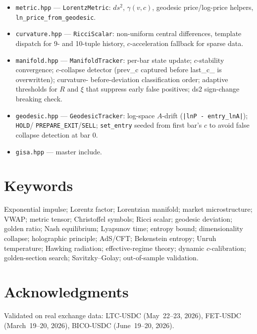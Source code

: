\documentclass[12pt,a4paper]{article}
\begin{document}
\begin{itemize}
    \item \texttt{metric.hpp} --- \texttt{LorentzMetric}: $ds^2$,
          $\gamma(v,c)$, geodesic price/log-price helpers,
          \texttt{ln\_price\_from\_geodesic}.
    \item \texttt{curvature.hpp} --- \texttt{RicciScalar}: non-uniform
          central differences, template dispatch for 9- and 10-tuple
          history, $c$-acceleration fallback for sparse data.
    \item \texttt{manifold.hpp} --- \texttt{ManifoldTracker}: per-bar
          state update; $c$-stability convergence; $c$-collapse detector
          (prev\_c captured before last\_c\_ is overwritten); curvature-
          before-deviation classification order; adaptive thresholds for
          $R$ and $\xi$ that suppress early false positives; ds2
          sign-change breaking check.
    \item \texttt{geodesic.hpp} --- \texttt{GeodesicTracker}: log-space
          $A$-drift (\texttt{|lnP - entry\_lnA|}); \texttt{HOLD}/
          \texttt{PREPARE\_EXIT}/\texttt{SELL}; \texttt{set\_entry}
          seeded from first bar's $c$ to avoid false collapse detection
          at bar 0.
    \item \texttt{gisa.hpp} --- master include.
\end{itemize}

\section*{Keywords}

Exponential impulse; Lorentz factor; Lorentzian manifold; market
microstructure; VWAP; metric tensor; Christoffel symbols; Ricci scalar;
geodesic deviation; golden ratio; Nash equilibrium; Lyapunov time; entropy
bound; dimensionality collapse; holographic principle; AdS/CFT;
Bekenstein entropy; Unruh temperature; Hawking radiation; effective-regime
theory; dynamic $c$-calibration; golden-section search; Savitzky--Golay;
out-of-sample validation.

\section*{Acknowledgments}

Validated on real exchange data: LTC-USDC (May~22--23, 2026), FET-USDC
(March~19--20, 2026), BICO-USDC (June~19--20, 2026).
\end{document}
